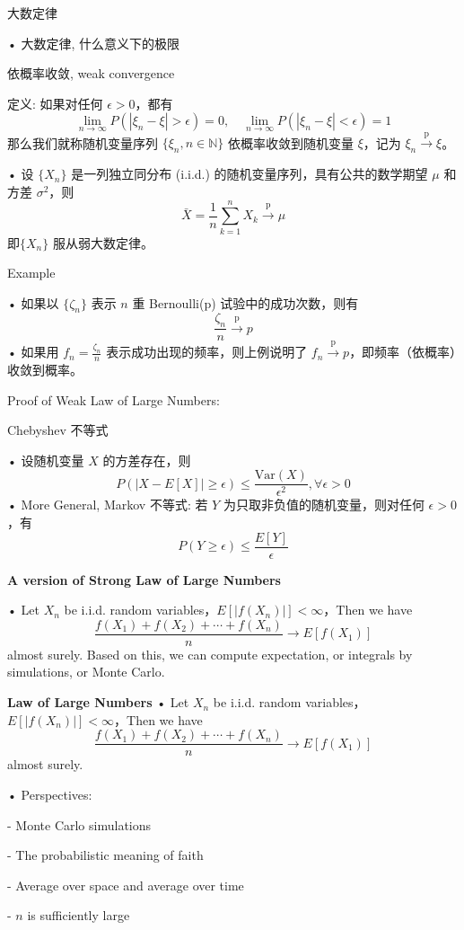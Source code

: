 \documentclass[UTF8]{report}
\theoremstyle{MyLineTheoremStyle} %
\theoremstyle{MyBlockTheoremStyle} %
\theoremstyle{MySubsubsectionStyle} %
\begin{document}
\vspace{1cm}

大数定律\par
• 大数定律, 什么意义下的极限\par
依概率收敛, weak convergence\par
定义: 如果对任何 $\epsilon > 0$，都有
\[
\lim_{n \to \infty} P(|\xi_n - \xi| > \epsilon) = 0, \quad \lim_{n \to \infty} P(|\xi_n - \xi| < \epsilon) = 1
\]
那么我们就称随机变量序列 $\{\xi_n, n \in \mathbb{N}\}$ 依概率收敛到随机变量 $\xi$，记为 $\xi_n \xrightarrow{\text{p}} \xi$。

• 设 $\{X_n\}$ 是一列独立同分布 (i.i.d.) 的随机变量序列，具有公共的数学期望 $\mu$ 和方差 $\sigma^2$，则 
\[
\bar{X} = \frac{1}{n} \sum_{k=1}^{n}X_k \xrightarrow{\text{p}} \mu
\]
即$\{X_n\}$ 服从弱大数定律。

\vspace{1cm}

Example\par
• 如果以 $\{\zeta_n\}$ 表示 $n$ 重 Bernoulli(p) 试验中的成功次数，则有
\[
\frac{\zeta_n}{n} \xrightarrow{\text{p}} p
\]
• 如果用 $f_n = \frac{\zeta_n}{n}$ 表示成功出现的频率，则上例说明了 $f_n \xrightarrow{\text{p}} p$，即频率（依概率）收敛到概率。

\vspace{1cm}

Proof of Weak Law of Large Numbers:\par
Chebyshev 不等式\par
• 设随机变量 $X$ 的方差存在，则
\[
P(|X - E[X]| \geq \epsilon) \leq \frac{\text{Var}(X)}{\epsilon^2}, \forall \epsilon > 0
\]
• More General, Markov 不等式:
若 $Y$ 为只取非负值的随机变量，则对任何 $\epsilon > 0$，有
\[
P(Y \geq \epsilon) \leq \frac{E[Y]}{\epsilon}
\]

\vspace{1cm}

\textbf{A version of Strong Law of Large Numbers}\par
• Let $X_n$ be i.i.d. random variables，$E[|f(X_n)|] < \infty$，Then we have
\[
\frac{f(X_1) + f(X_2) + \cdots + f(X_n)}{n} \to E[f(X_1)]
\]
almost surely.
Based on this, we can compute expectation, or integrals by simulations, or Monte Carlo.

\vspace{1cm}

\textbf{Law of Large Numbers}
• Let $X_n$ be i.i.d. random variables，$E[|f(X_n)|] < \infty$，Then we have
\[
\frac{f(X_1) + f(X_2) + \cdots + f(X_n)}{n} \to E[f(X_1)]
\]
almost surely.\par
• Perspectives: \par
  - Monte Carlo simulations\par 
  - The probabilistic meaning of faith \par
  - Average over space and average over time \par
  - $n$ is sufficiently large\par
\end{document}
